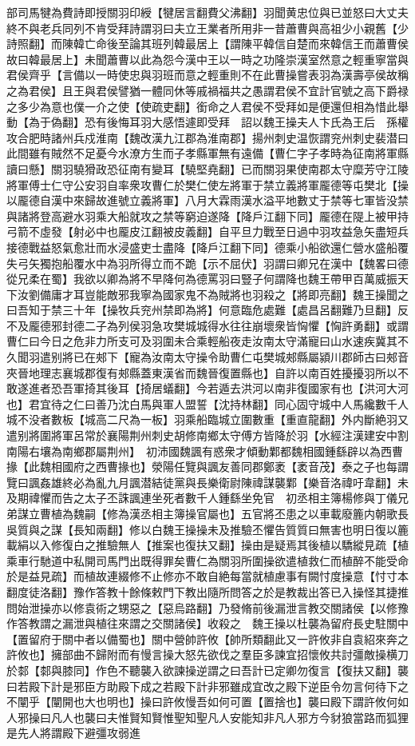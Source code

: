 部司馬犍為費詩即授關羽印綬【犍居言翻費父沸翻】羽聞黄忠位與已並怒曰大丈夫終不與老兵同列不肯受拜詩謂羽曰夫立王業者所用非一昔蕭曹與高祖少小親舊【少詩照翻】而陳韓亡命後至論其班列韓最居上【謂陳平韓信自楚而來韓信王而蕭曹侯故曰韓最居上】未聞蕭曹以此為怨今漢中王以一時之功隆崇漢室然意之輕重寧當與君侯齊乎【言備以一時使忠與羽班而意之輕重則不在此曹操嘗表羽為漢壽亭侯故稱之為君侯】且王與君侯譬猶一體同休等戚禍福共之愚謂君侯不宜計官號之高下爵禄之多少為意也僕一介之使【使疏吏翻】銜命之人君侯不受拜如是便還但相為惜此舉動【為于偽翻】恐有後悔耳羽大感悟遽即受拜　詔以魏王操夫人卞氏為王后　孫權攻合肥時諸州兵戍淮南【魏改漢九江郡為淮南郡】揚州刺史温恢謂兖州刺史裴潜曰此間雖有賊然不足憂今水潦方生而子孝縣軍無有遠備【曹仁字子孝時為征南將軍縣讀曰懸】關羽驍猾政恐征南有變耳【驍堅堯翻】已而關羽果使南郡太守糜芳守江陵將軍傅士仁守公安羽自率衆攻曹仁於樊仁使左將軍于禁立義將軍龎德等屯樊北【操以龎德自漢中來歸故進號立義將軍】八月大霖雨漢水溢平地數丈于禁等七軍皆没禁與諸將登高避水羽乘大船就攻之禁等窮迫遂降【降戶江翻下同】龎德在隄上被甲持弓箭不虛發【射必中也龎皮江翻被皮義翻】自平旦力戰至日過中羽攻益急矢盡短兵接德戰益怒氣愈壯而水浸盛吏士盡降【降戶江翻下同】德乘小船欲還仁營水盛船覆失弓矢獨抱船覆水中為羽所得立而不跪【示不屈伏】羽謂曰卿兄在漢中【魏畧曰德從兄柔在蜀】我欲以卿為將不早降何為德罵羽曰豎子何謂降也魏王帶甲百萬威振天下汝劉備庸才耳豈能敵邪我寧為國家鬼不為賊將也羽殺之【將即亮翻】魏王操聞之曰吾知于禁三十年【操牧兵兖州禁即為將】何意臨危處難【處昌呂翻難乃旦翻】反不及龎德邪封德二子為列侯羽急攻樊城城得水往往崩壞衆皆恟懼【恟許勇翻】或謂曹仁曰今日之危非力所支可及羽圍未合乘輕船夜走汝南太守滿寵曰山水速疾冀其不久聞羽遣别將已在郟下【寵為汝南太守操令助曹仁屯樊城郟縣屬潁川郡師古曰郟音夾晉地理志襄城郡復有郟縣蓋東漢省而魏晉復置縣也】自許以南百姓擾擾羽所以不敢遂進者恐吾軍掎其後耳【掎居蟻翻】今若遁去洪河以南非復國家有也【洪河大河也】君宜待之仁曰善乃沈白馬與軍人盟誓【沈持林翻】同心固守城中人馬纔數千人城不没者數板【城高二尺為一板】羽乘船臨城立圍數重【重直龍翻】外内斷絶羽又遣别將圍將軍呂常於襄陽荆州刺史胡修南鄉太守傅方皆降於羽【水經注漢建安中割南陽右壤為南鄉郡屬荆州】　初沛國魏諷有惑衆才傾動鄴都魏相國鍾繇辟以為西曹掾【此魏相國府之西曹掾也】滎陽任覽與諷友善同郡鄭袤【袤音茂】泰之子也每謂覽曰諷姦雄終必為亂九月諷潜結徒黨與長樂衛尉陳禕謀襲鄴【樂音洛禕吁韋翻】未及期禕懼而告之太子丕誅諷連坐死者數千人鍾繇坐免官　初丞相主簿楊修與丁儀兄弟謀立曹植為魏嗣【修為漢丞相主簿操官屬也】五官將丕患之以車載廢簏内朝歌長吳質與之謀【長知兩翻】修以白魏王操操未及推驗丕懼告質質曰無害也明日復以簏載絹以入修復白之推驗無人【推案也復扶又翻】操由是疑焉其後植以驕縱見疏【植乘車行馳道中私開司馬門出既得罪矣曹仁為關羽所圍操欲遣植救仁而植醉不能受命於是益見疏】而植故連綴修不止修亦不敢自絶每當就植慮事有闕忖度操意【忖寸本翻度徒洛翻】豫作答教十餘條敕門下教出隨所問答之於是教裁出答已入操怪其捷推問始泄操亦以修袁術之甥惡之【惡烏路翻】乃發脩前後漏泄言教交關諸侯【以修豫作答教謂之漏泄與植往來謂之交關諸侯】收殺之　魏王操以杜襲為留府長史駐關中【置留府于關中者以備蜀也】關中營帥許攸【帥所類翻此又一許攸非自袁紹來奔之許攸也】擁部曲不歸附而有慢言操大怒先欲伐之羣臣多諫宜招懷攸共討彊敵操横刀於䣛【䣛與膝同】作色不聽襲入欲諫操逆謂之曰吾計已定卿勿復言【復扶又翻】襲曰若殿下計是邪臣方助殿下成之若殿下計非邪雖成宜改之殿下逆臣令勿言何待下之不闡乎【闡開也大也明也】操曰許攸慢吾如何可置【置捨也】襲曰殿下謂許攸何如人邪操曰凡人也襲曰夫惟賢知賢惟聖知聖凡人安能知非凡人邪方今豺狼當路而狐狸是先人將謂殿下避彊攻弱進